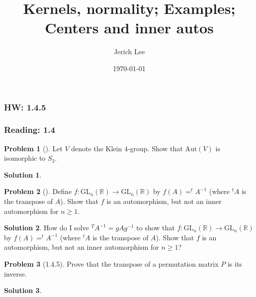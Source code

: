 \documentclass[12pt]{article}
\title{Kernels, normality; Examples; Centers and inner autos}
\author{Jerich Lee}
\date{\today}
\theoremstyle{definition} %
\newtheorem{solution}{Solution}
\newtheorem{problem}{Problem}
\theoremstyle{plain} %
\begin{document}
\maketitle
\subsubsection*{HW: 1.4.5} 
\subsubsection*{Reading: 1.4} 

\begin{problem}[]
   Let $V$ denote the Klein $4$-group. Show that $\text{Aut}(V)$ is isomorphic to $S_3$.  
\end{problem}
\begin{solution}
    
\end{solution}
\begin{problem}[]
   Define $f:\text{GL}_{n} (\mathbb{{R}})\to \text{GL}_n(\mathbb{{R}})  $  by $f(A)=^{t}A^{-1}$ (where $^{t}A$ is the transpose of $A$). Show that $f$ is an automorphism, but not an inner automorphism for $n\geq 1$. 
\end{problem}
\begin{solution}
   How do I solve $^{T}A^{-1}= gAg^{-1}$ to show that $f:\text{GL}_{n} (\mathbb{{R}})\to \text{GL}_n(\mathbb{{R}})  $  by $f(A)=^{t}A^{-1}$ (where $^{t}A$ is the transpose of $A$). Show that $f$ is an automorphism, but not an inner automorphism for $n\geq 1$?
\end{solution}
\begin{problem}[1.4.5]
    Prove that the transpose of a permutation matrix $P$ is its inverse.

\end{problem}
\begin{solution}
    
\end{solution}
\end{document}
